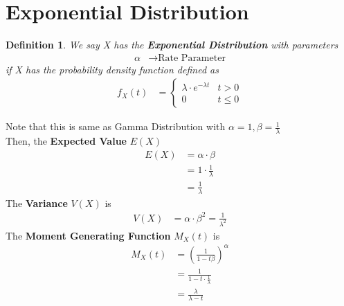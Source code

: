 \documentclass[11pt,oneside]{book}
\theoremstyle{break}
\theoremstyle{break}
\newtheorem{defn}{Definition}[corL]
\begin{document}
\section[Exponential Distribution]{\color{DarkOrchid}Exponential Distribution\color{black}}
\begin{defn}
We say X has the \textbf{Exponential Distribution} with parameters\begin{align*}
\alpha &\rightarrow \text{Rate Parameter}
\end{align*}
if X has the probability density function defined as \begin{align*}
f_X(t)&=\begin{cases}
\lambda \cdot e^{-\lambda t}&t>0\\
0&t\leq 0
\end{cases}
\end{align*}
\end{defn}
Note that this is same as Gamma Distribution with $\alpha=1,\beta=\frac{1}{\lambda}$\\
Then, the \textbf{Expected Value }$E(X)$\begin{align*}
E(X)&=\alpha \cdot \beta \\
&=1\cdot \frac{1}{\lambda}\\
&=\frac{1}{\lambda}
\end{align*}
The \textbf{Variance} $V(X)$ is \begin{align*}
V(X)&=\alpha \cdot \beta^2=\frac{1}{\lambda^2}
\end{align*}
The \textbf{Moment Generating Function} $M_X(t)$ is \begin{align*}
M_X(t)&=\left(\frac{1}{1-t\beta} \right)^{\alpha}\\
&=\frac{1}{1-t\cdot\frac{1}{\lambda}}\\
&=\frac{\lambda}{\lambda-t}
\end{align*}
\end{document}
